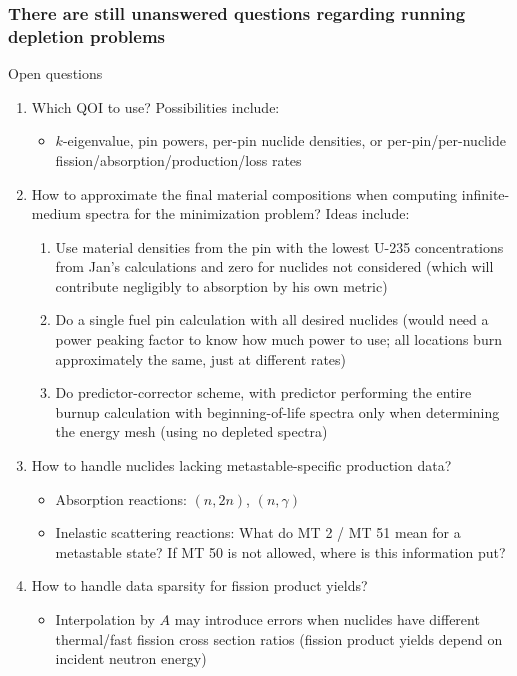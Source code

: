 \documentclass[compress,10pt]{beamer}
\begin{document}
\begin{frame}
    \frametitle{There are still unanswered questions regarding running depletion problems}

    \begin{block}{Open questions}
        \begin{enumerate}
            \item Which QOI to use? Possibilities include:
            \begin{itemize}
                \footnotesize
                \item[] $k$-eigenvalue, pin powers, per-pin nuclide densities, or per-pin/per-nuclide fission/absorption/production/loss rates
            \end{itemize}
            \item How to approximate the final material compositions when computing infinite-medium spectra for the minimization problem? Ideas include:
            \begin{enumerate}
                \footnotesize
                \item Use material densities from the pin with the lowest U-235 concentrations from Jan's calculations and zero for nuclides not considered (which will contribute negligibly to absorption by his own metric)
                \item Do a single fuel pin calculation with all desired nuclides (would need a power peaking factor to know how much power to use; all locations burn approximately the same, just at different rates)
                \item Do predictor-corrector scheme, with predictor performing the entire burnup calculation with beginning-of-life spectra only when determining the energy mesh (using no depleted spectra)
            \end{enumerate}
            \item How to handle nuclides lacking metastable-specific production data?
            \begin{itemize}
                \footnotesize
                \item Absorption reactions: $(n,2n)$, $(n,\gamma)$
                \item Inelastic scattering reactions: What do MT 2 / MT 51 mean for a metastable state?  If MT 50 is not allowed, where is this information put?
            \end{itemize}
           \item How to handle data sparsity for fission product yields?
           \begin{itemize}
               \footnotesize
               \item[] Interpolation by $A$ may introduce errors when nuclides have different thermal/fast fission cross section ratios (fission product yields depend on incident neutron energy)
           \end{itemize}
        \end{enumerate}
    \end{block}

\end{frame}
\end{document}
